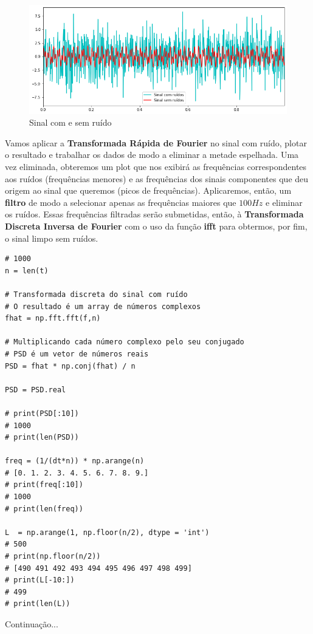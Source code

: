 \begin{figure}[H]
	\centering
	\includegraphics[width=1\textwidth]{./Imagens/Transformada de Fourier/TF3.png} 
	\caption{Sinal com e sem ruído}
	\label{fig:TF3}
\end{figure}

Vamos aplicar a \textbf{Transformada Rápida de Fourier} no sinal com ruído, plotar o resultado e trabalhar os dados de modo a eliminar a metade espelhada. Uma vez eliminada, obteremos um plot que nos exibirá as frequências correspondentes aos ruídos (frequências menores) e as frequências dos sinais componentes que deu origem ao sinal que queremos (picos de frequências). Aplicaremos, então, um \textbf{filtro} de modo a selecionar apenas as frequências maiores que $100Hz$ e eliminar os ruídos. Essas frequências filtradas serão submetidas, então, à \textbf{Transformada Discreta Inversa de Fourier} com o uso da função \textbf{ifft} para obtermos, por fim, o sinal limpo sem ruídos.

\begin{verbatim}
# 1000
n = len(t)

# Transformada discreta do sinal com ruído
# O resultado é um array de números complexos
fhat = np.fft.fft(f,n)

# Multiplicando cada número complexo pelo seu conjugado
# PSD é um vetor de números reais
PSD = fhat * np.conj(fhat) / n

PSD = PSD.real

# print(PSD[:10])
# 1000
# print(len(PSD))

freq = (1/(dt*n)) * np.arange(n)
# [0. 1. 2. 3. 4. 5. 6. 7. 8. 9.]
# print(freq[:10])
# 1000
# print(len(freq))

L  = np.arange(1, np.floor(n/2), dtype = 'int')
# 500
# print(np.floor(n/2))
# [490 491 492 493 494 495 496 497 498 499]
# print(L[-10:])
# 499
# print(len(L))
\end{verbatim}

Continuação...

